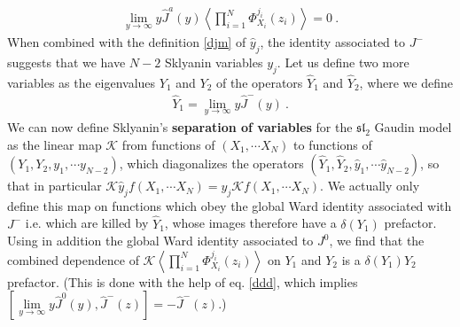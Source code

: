 \documentclass[12pt,a4paper,notitlepage]{report}
\numberwithin{equation}{section}
\theoremstyle{break}
\begin{document}
\begin{align}
 \underset{y\rightarrow \infty}{\lim} y \hat{J}^a(y) \left\langle \prod_{i=1}^N \Phi^{j_i}_{X_i}(z_i)\right\rangle = 0\ .
\end{align}
When combined with the definition \eqref{djm} of $\hat{y}_j$, the identity associated to $J^-$ suggests that we have $N-2$ Sklyanin variables $y_j$.
Let us define two more variables as the eigenvalues $Y_1$ and $Y_2$ of the operators $\hat{Y}_1$ and $\hat{Y}_2$, where we define
\begin{align}
 \hat{Y}_1 = \underset{y\rightarrow \infty}{\lim} y \hat{J}^-(y)\ .
\end{align}
We can now define Sklyanin's \textbf{\boldmath separation of variables} for the $\mathfrak{sl}_2$ Gaudin model as the linear 
map $\mathcal{K}$ from functions of $(X_1,\cdots X_N)$ to functions of $(Y_1,Y_2,y_1,\cdots y_{N-2})$, which diagonalizes the operators $(\hat{Y}_1,\hat{Y}_2,\hat{y}_1,\cdots \hat{y}_{N-2})$, so that in particular $\mathcal{K} \hat{y}_j f(X_1,\cdots X_N) = y_j \mathcal{K} f(X_1,\cdots X_N)$.
We actually only define this map on 
functions which obey the global Ward identity associated with $J^-$ i.e.
which are killed by $\hat{Y}_1$, whose images therefore have a $\delta(Y_1)$ prefactor.
Using in addition the global Ward identity associated to $J^0$, we find that the combined dependence of $\mathcal{K}\left\langle \prod_{i=1}^N \Phi^{j_i}_{X_i}(z_i)\right\rangle$ on $Y_1$ and $Y_2$ is a $\delta(Y_1)Y_2$ prefactor.
(This is done with the help of eq. \eqref{ddd}, which implies $[\underset{y\rightarrow \infty}{\lim} y \hat{J}^0(y),\hat{J}^-(z)]=-\hat{J}^-(z)$.)
\end{document}
